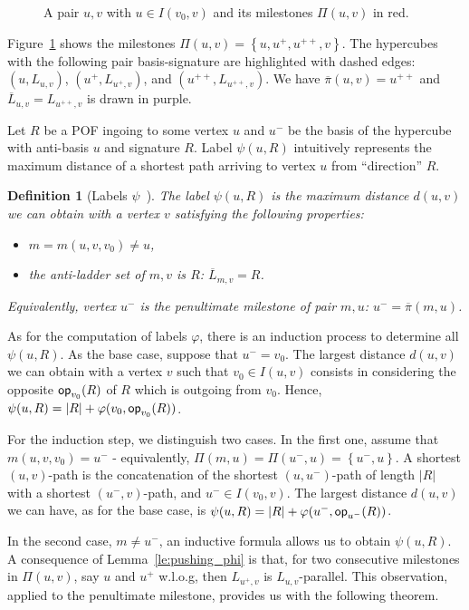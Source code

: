\documentclass{article}
\newtheorem{definition}{Definition}
\newcommand{\set}[1]{\left\{ #1 \right\}}
\newcommand{\card}[1]{\left| #1 \right|}
\newcommand{\opp}{\mbox{\textsf{op}}}
\begin{document}
\begin{figure}[h]
\centering
\scalebox{0.9}{}
\caption{A pair $u,v$ with $u \in I(v_0,v)$ and its milestones $\Pi(u,v)$ in red.}
\label{fig:milestones}
\end{figure}

Figure~\ref{fig:milestones} shows the milestones $\Pi(u,v) = \set{u,u^+,u^{++},v}$. The hypercubes with the following pair basis-signature are highlighted with dashed edges: $(u,L_{u,v})$, $(u^+,L_{u^+,v})$, and $(u^{++},L_{u^{++},v})$. We have $\overline{\pi}(u,v) = u^{++}$ and $\overline{L}_{u,v} = L_{u^{++},v}$ is drawn in purple.

Let $R$ be a POF ingoing to some vertex $u$ and $u^-$ be the basis of the hypercube with anti-basis $u$ and signature $R$.  Label $\psi(u,R)$ intuitively represents the maximum distance of a shortest path arriving to vertex $u$ from ``direction'' $R$. 

\begin{definition}[Labels $\psi$~\cite{BeHa21}]
The label $\psi(u,R)$ is the maximum distance $d(u,v)$ we can obtain with a vertex $v$ satisfying the following properties:
\begin{itemize}
\item $m = m(u,v,v_0) \neq u$,
\item the anti-ladder set of $m,v$ is $R$: $\overline{L}_{m,v} = R$.
\end{itemize}
Equivalently, vertex $u^-$ is the penultimate milestone of pair $m,u$: $u^- = \overline{\pi}(m,u)$.
\label{def:psi}
\end{definition}

As for the computation of labels $\varphi$, there is an induction process to determine all $\psi(u,R)$. As the base case, suppose that $u^- = v_0$. The largest distance $d(u,v)$ we can obtain with a vertex $v$ such that $v_0 \in I(u,v)$ consists in considering the opposite $\opp_{v_0}(R)$ of $R$ which is outgoing from $v_0$. Hence, $\psi(u,R) = \card{R} + \varphi(v_0,\opp_{v_0}(R))$.

For the induction step, we distinguish two cases. In the first one, assume that $m(u,v,v_0) = u^-$ - equivalently, $\Pi(m,u) = \Pi(u^-,u) = \set{u^-,u}$. A shortest $(u,v)$-path is the concatenation of the shortest $(u,u^-)$-path of length $\card{R}$ with a shortest $(u^-,v)$-path, and $u^- \in I(v_0,v)$. The largest distance $d(u,v)$ we can have, as for the base case, is $\psi(u,R) = \card{R} + \varphi(u^-,\opp_{u^-}(R))$.

In the second case, $m \neq u^-$, an inductive formula allows us to obtain $\psi(u,R)$. A consequence of Lemma~\ref{le:pushing_phi} is that, for two consecutive milestones in $\Pi(u,v)$, say $u$ and $u^+$ w.l.o.g, then $L_{u^+,v}$ is $L_{u,v}$-parallel. This observation, applied to the penultimate milestone, provides us with the following theorem.
\end{document}
